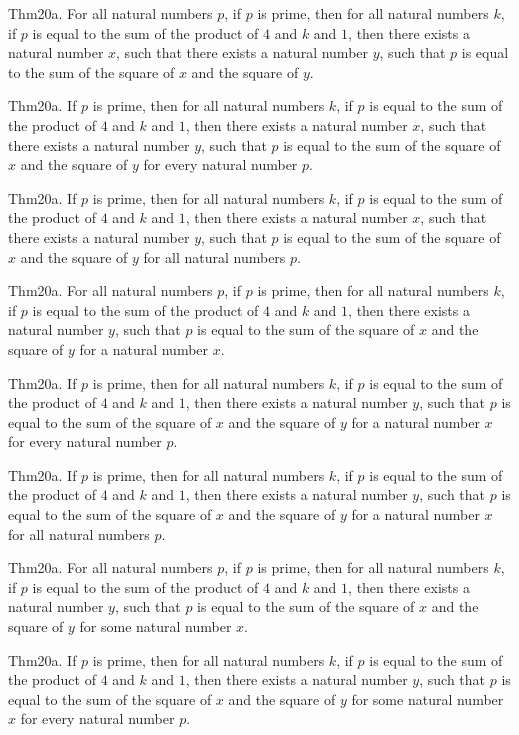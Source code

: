 \documentclass{article}
\begin{document}
Thm20a. For all natural numbers $p$, if $p$ is prime, then for all natural numbers $k$, if $p$ is equal to the sum of the product of $4$ and $k$ and $1$, then there exists a natural number $x$, such that there exists a natural number $y$, such that $p$ is equal to the sum of the square of $x$ and the square of $y$.

Thm20a. If $p$ is prime, then for all natural numbers $k$, if $p$ is equal to the sum of the product of $4$ and $k$ and $1$, then there exists a natural number $x$, such that there exists a natural number $y$, such that $p$ is equal to the sum of the square of $x$ and the square of $y$ for every natural number $p$.

Thm20a. If $p$ is prime, then for all natural numbers $k$, if $p$ is equal to the sum of the product of $4$ and $k$ and $1$, then there exists a natural number $x$, such that there exists a natural number $y$, such that $p$ is equal to the sum of the square of $x$ and the square of $y$ for all natural numbers $p$.

Thm20a. For all natural numbers $p$, if $p$ is prime, then for all natural numbers $k$, if $p$ is equal to the sum of the product of $4$ and $k$ and $1$, then there exists a natural number $y$, such that $p$ is equal to the sum of the square of $x$ and the square of $y$ for a natural number $x$.

Thm20a. If $p$ is prime, then for all natural numbers $k$, if $p$ is equal to the sum of the product of $4$ and $k$ and $1$, then there exists a natural number $y$, such that $p$ is equal to the sum of the square of $x$ and the square of $y$ for a natural number $x$ for every natural number $p$.

Thm20a. If $p$ is prime, then for all natural numbers $k$, if $p$ is equal to the sum of the product of $4$ and $k$ and $1$, then there exists a natural number $y$, such that $p$ is equal to the sum of the square of $x$ and the square of $y$ for a natural number $x$ for all natural numbers $p$.

Thm20a. For all natural numbers $p$, if $p$ is prime, then for all natural numbers $k$, if $p$ is equal to the sum of the product of $4$ and $k$ and $1$, then there exists a natural number $y$, such that $p$ is equal to the sum of the square of $x$ and the square of $y$ for some natural number $x$.

Thm20a. If $p$ is prime, then for all natural numbers $k$, if $p$ is equal to the sum of the product of $4$ and $k$ and $1$, then there exists a natural number $y$, such that $p$ is equal to the sum of the square of $x$ and the square of $y$ for some natural number $x$ for every natural number $p$.
\end{document}
